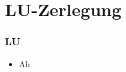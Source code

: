 

\section{LU-Zerlegung}
\begin{frame}
	\frametitle{LU}
	\vspace{-4cm}
	\begin{itemize}
		\item Ah
	\end{itemize}
\end{frame}



